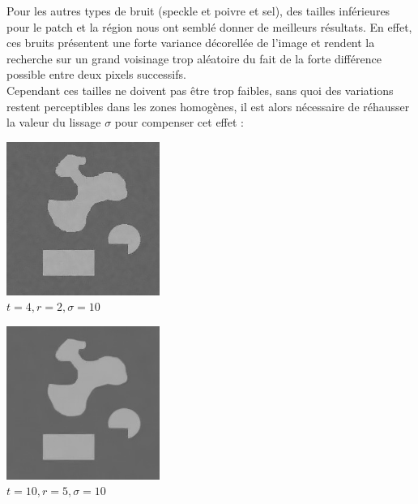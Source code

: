 \documentclass[a4,12pt]{article}
\begin{document}
Pour les autres types de bruit (speckle et poivre et sel), des tailles inférieures pour le patch et la région nous ont semblé donner de meilleurs résultats. En effet, ces bruits présentent une forte variance décorellée de l'image et rendent la recherche sur un grand voisinage trop aléatoire du fait de la forte différence possible entre deux pixels successifs.\\

Cependant ces tailles ne doivent pas être trop faibles, sans quoi des variations restent perceptibles dans les zones homogènes, il est alors nécessaire de réhausser la valeur du lissage $\sigma$ pour compenser cet effet :\\

\noindent
\begin{minipage}[c]{0.50\linewidth}
	\begin{center}
		\includegraphics[width = 50mm]{./img/nltroppetit4-2-10.jpg}\\
		\textit{$t=4, r=2, \sigma=10$}\\
	\end{center}
\end{minipage}
\begin{minipage}[c]{0.50\linewidth}
	\begin{center}
		\includegraphics[width = 50mm]{./img/nlassezgrand10-5-10.jpg}\\
		\textit{$t=10, r=5, \sigma=10$}\\
	\end{center}
\end{minipage}\\
\\
\end{document}
